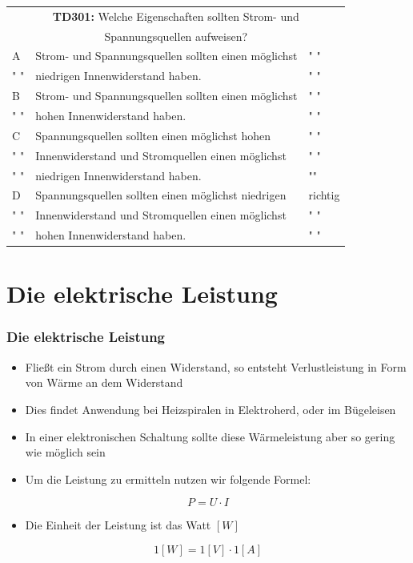 \begin{frame}
	\begin{small}	
	\begin{tabular}{|l|l|l|}
	\hline
		\multicolumn{3}{|c|}{\textbf{TD301:} Welche Eigenschaften sollten Strom- und}\\
		\multicolumn{3}{|c|}{Spannungsquellen aufweisen?}\\
		\hline
		A &  Strom- und Spannungsquellen sollten einen möglichst  & " " \\
		" " & niedrigen Innenwiderstand haben. & " "\\ \hline
		B &  Strom- und Spannungsquellen sollten einen möglichst  & " " \\
		" " & hohen Innenwiderstand haben. & " "\\ \hline
		C & Spannungsquellen sollten einen möglichst hohen & " " \\
		" " & Innenwiderstand und Stromquellen einen möglichst  & " " \\ 
		" " & niedrigen Innenwiderstand haben.  & "" \\ \hline
		D & Spannungsquellen sollten einen möglichst niedrigen & richtig \\
		" " & Innenwiderstand und Stromquellen einen möglichst & " " \\ 
		" " & hohen Innenwiderstand haben.  & " " \\ \hline 		
	\end{tabular}
	\end{small}
\end{frame}

\section{Die elektrische Leistung}
\begin{frame}
	\frametitle{Die elektrische Leistung}
	\begin{itemize}
		\item	Fließt ein Strom durch einen Widerstand, so entsteht Verlustleistung in Form von Wärme an dem Widerstand
		\item	Dies findet Anwendung bei Heizspiralen in Elektroherd, oder im Bügeleisen
		\item	In einer elektronischen Schaltung sollte diese Wärmeleistung aber so gering wie möglich sein
		\item	Um die Leistung zu ermitteln nutzen wir folgende Formel:
	\end{itemize}
	\begin{equation}
		P = U \cdot I
	\end{equation}
	\begin{itemize}
		\item	Die Einheit der Leistung ist das Watt $[W]$
	\end{itemize}
	\begin{equation}
		 1[W] = 1[V] \cdot 1[A]
	\end{equation}
\end{frame}

